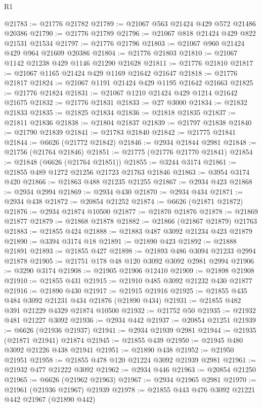 \begin{lexlean}{R1}
\begin{coremodule}
@21783 := @21776 @21782
@21789 := @21067 @563 @21424 @429 @572 @21486 @20386
@21790 := @21776 @21789
@21796 := @21067 @818 @21424 @429 @822 @21531 @21534
@21797 := @21776 @21796
@21803 := @21067 @960 @21424 @429 @964 @21609 @20386
@21804 := @21776 @21803
@21810 := @21067 @1142 @21238 @429 @1146 @21290 @21628
@21811 := @21776 @21810
@21817 := @21067 @1165 @21424 @429 @1169 @21642 @21647
@21818 := @21776 @21817
@21824 := @21067 @1191 @21424 @429 @1195 @21642 @21663
@21825 := @21776 @21824
@21831 := @21067 @1210 @21424 @429 @1214 @21642 @21675
@21832 := @21776 @21831
@21833 := @27 @3000
@21834 := @21832 @21833
@21835 := @21825 @21834
@21836 := @21818 @21835
@21837 := @21811 @21836
@21838 := @21804 @21837
@21839 := @21797 @21838
@21840 := @21790 @21839
@21841 := @21783 @21840
@21842 := @21775 @21841
@21844 := @6626 (@21772 @21842)
@21846 := @2934 @21844 @2981
@21848 := @21756 (@21764 @21846)
@21851 := @21775 (@21776 @21770 @21841)
@21854 := @21848 (@6626 (@21764 @21851))
@21855 := @3244 @3174
@21861 := @21855 @489 @1272 @21256 @21723 @21763 @21846
@21863 := @3954 @3174 @420
@21866 := @21863 @488 @21235 @21255
@21867 := @2934 @423
@21868 := @2934 @2994
@21869 := @2934 @430
@21870 := @2934 @434
@21871 := @2934 @438
@21872 := @20854 @21252
@21874 := @6626 (@21871 @21872)
@21876 := @2934 @21874 @10500
@21877 := @21870 @21876
@21878 := @21869 @21877
@21879 := @21868 @21878
@21882 := @21866 (@21867 @21879) @21763
@21883 := @21855 @424
@21888 := @21883 @487 @3092 @21234 @423 @21879
@21890 := @3394 @3174 @18
@21891 := @21890 @423
@21892 := @21888 @21891
@21893 := @21855 @427
@21898 := @21893 @486 @3094 @21233 @2994 @21878
@21905 := @21751 @178 @48 @120 @3092 @3092 @2981 @2994
@21906 := @3290 @3174
@21908 := @21905 @21906 @12410
@21909 := @21898 @21908
@21910 := @21855 @431
@21915 := @21910 @485 @3092 @21232 @430 @21877
@21916 := @21890 @430
@21917 := @21915 @21916
@21925 := @21855 @435 @484 @3092 @21231 @434 @21876 (@21890 @434)
@21931 := @21855 @482 @391 @21229 @4329 @21874 @10500
@21932 := @21752 @50
@21935 := @21932 @481 @21227 @3092
@21936 := @2934 @442
@21937 := @20854 @21251
@21939 := @6626 (@21936 @21937)
@21941 := @2934 @21939 @2981
@21944 := @21935 (@21871 @21941) @21874
@21945 := @21855 @439
@21950 := @21945 @480 @3092 @21226 @438 @21941
@21951 := @21890 @438
@21952 := @21950 @21951
@21958 := @21855 @478 @120 @21224 @3092 @21939 @2981
@21961 := @21932 @477 @21222 @3092
@21962 := @2934 @446
@21963 := @20854 @21250
@21965 := @6626 (@21962 @21963)
@21967 := @2934 @21965 @2981
@21970 := @21961 (@21936 @21967) @21939
@21978 := @21855 @443 @476 @3092 @21221 @442 @21967 (@21890 @442)

\end{coremodule}
\end{lexlean}
